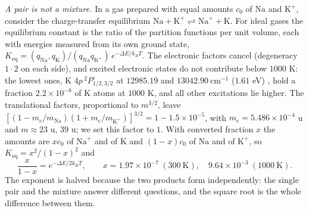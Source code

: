 \documentclass[11pt]{article}
\theoremstyle{definition}\newtheorem{definition}[theorem]{Definition}
\theoremstyle{remark}\newtheorem{remark}[theorem]{Remark}
\begin{document}
\emph{A pair is not a mixture.} In a gas prepared with equal amounts $c_0$ of $\mathrm{Na}$ and $\mathrm K^+$, consider the charge-transfer equilibrium $\mathrm{Na}+\mathrm K^+\rightleftharpoons\mathrm{Na}^++\mathrm K$. For ideal gases the equilibrium constant is the ratio of the partition functions per unit volume, each with energies measured from its own ground state, $K_{\mathrm{eq}}=(q_{\mathrm{Na}^+}q_{\mathrm K})/(q_{\mathrm{Na}}q_{\mathrm K^+})\,e^{-\Delta E/k_BT}$. The electronic factors cancel (degeneracy $1\cdot2$ on each side), and excited electronic states do not contribute below $1000$ K: the lowest ones, K $4p\,{}^2P^\circ_{1/2,3/2}$ at $12985.19$ and $13042.90\ \mathrm{cm^{-1}}$ ($1.61$ eV) \cite{NIST}, hold a fraction $2.2\times10^{-8}$ of K atoms at $1000$ K, and all other excitations lie higher. The translational factors, proportional to $m^{3/2}$, leave $[(1-m_e/m_{\mathrm{Na}})(1+m_e/m_{\mathrm{K^+}})]^{3/2}=1-1.5\times10^{-5}$, with $m_e=5.486\times10^{-4}$ u \cite{CODATA} and $m\approx23$ u, $39$ u; we set this factor to $1$. With converted fraction $x$ the amounts are $xc_0$ of $\mathrm{Na}^+$ and of $\mathrm K$ and $(1-x)c_0$ of $\mathrm{Na}$ and of $\mathrm K^+$, so $K_{\mathrm{eq}}=x^2/(1-x)^2$ and
\[
\frac{x}{1-x}=e^{-\Delta E/2k_BT},\qquad x=1.97\times10^{-7}\ (300\ \text{K}),\quad 9.64\times10^{-3}\ (1000\ \text{K}).
\]
The exponent is halved because the two products form independently: the single pair and the mixture answer different questions, and the square root is the whole difference between them.
\end{document}
